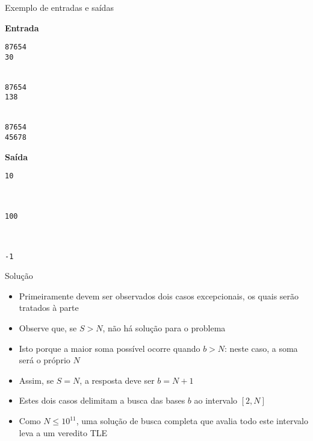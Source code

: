 \begin{frame}[fragile]{Exemplo de entradas e saídas}

\begin{minipage}[t]{0.55\textwidth}
\textbf{Entrada}
\begin{verbatim}
87654
30


87654
138


87654
45678
\end{verbatim}
\end{minipage}
\begin{minipage}[t]{0.4\textwidth}
\textbf{Saída}
\begin{verbatim}
10



100



-1
\end{verbatim}
\end{minipage}
\end{frame}

\begin{frame}[fragile]{Solução}

    \begin{itemize}
        \item Primeiramente devem ser observados dois casos excepcionais, os quais serão tratados
            à parte

        \item Observe que, se $S > N$, não há solução para o problema

        \item Isto porque a maior soma possível ocorre quando $b > N$: neste caso, a soma será o
            próprio $N$

        \item Assim, se $S = N$, a resposta deve ser $b = N + 1$ 

        \item Estes dois casos delimitam a busca das bases $b$ ao intervalo $[2, N]$

        \item Como $N\leq 10^{11}$, uma solução de busca completa que avalia todo este intervalo
            leva a um veredito TLE
    \end{itemize}

\end{frame}


